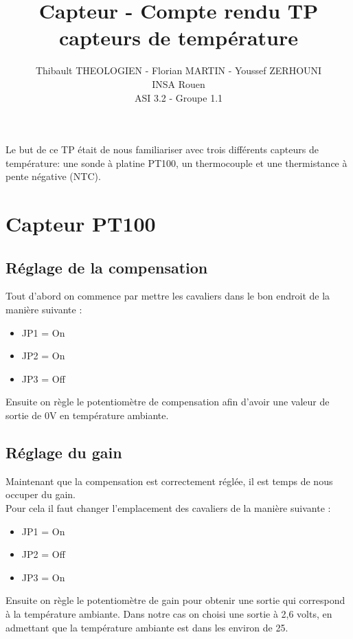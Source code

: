 \documentclass[a4paper,12pt]{article}
\title{Capteur - Compte rendu TP capteurs de température}
\author{
	Thibault THEOLOGIEN - Florian MARTIN - Youssef ZERHOUNI\\
	INSA Rouen\\
	ASI 3.2 - Groupe 1.1
}
\begin{document}
	\maketitle
	\tableofcontents
	\newpage

  \par Le but de ce TP était de nous familiariser avec trois différents capteurs de température: une sonde à platine PT100, un thermocouple et une thermistance à pente négative (NTC).

  \section{Capteur PT100}

    \subsection{Réglage de la compensation}
      \par Tout d'abord on commence par mettre les cavaliers dans le bon endroit de la manière suivante :
      \begin{itemize}
        \item JP1 = On
        \item JP2 = On
        \item JP3 = Off
      \end{itemize}
      Ensuite on règle le potentiomètre de compensation afin d'avoir une valeur de sortie de 0V en température ambiante.

    \subsection{Réglage du gain}
      \par Maintenant que la compensation est correctement réglée, il est temps de nous occuper du gain.\\
      Pour cela il faut changer l'emplacement des cavaliers de la manière suivante :
      \begin{itemize}
        \item JP1 = On
        \item JP2 = Off
        \item JP3 = On
      \end{itemize}
      Ensuite on règle le potentiomètre de gain pour obtenir une sortie qui correspond à la température ambiante.
      Dans notre cas on choisi une sortie à 2,6 volts, en admettant que la température ambiante est dans les environ de 25\degre.
\end{document}
